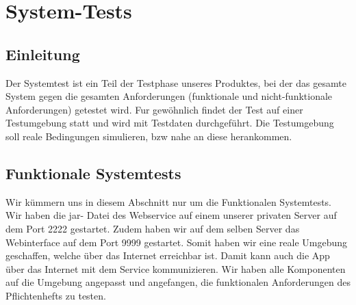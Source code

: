 \section{System-Tests}

\subsection{Einleitung}
Der Systemtest ist ein Teil der Testphase unseres Produktes, bei der das gesamte System gegen die gesamten Anforderungen (funktionale und nicht-funktionale Anforderungen) getestet wird. Fur gewöhnlich findet der Test auf einer Testumgebung statt und wird mit Testdaten durchgeführt. Die Testumgebung soll reale Bedingungen simulieren, bzw nahe an diese herankommen.
\subsection{Funktionale Systemtests}
Wir kümmern uns in diesem Abschnitt nur um die Funktionalen Systemtests.
Wir haben die jar- Datei des Webservice auf einem unserer privaten Server auf dem Port 2222 gestartet. Zudem haben wir auf dem selben Server das Webinterface auf dem Port 9999 gestartet. Somit haben wir eine reale Umgebung geschaffen, welche über das Internet erreichbar ist. Damit kann auch die App über das Internet mit dem Service kommunizieren. Wir haben alle Komponenten auf die Umgebung angepasst und angefangen, die funktionalen Anforderungen des Pflichtenhefts zu testen. \\

